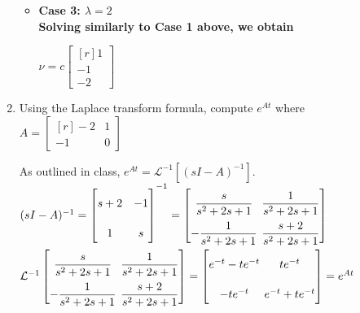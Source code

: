 \documentclass[11pt, oneside, letter]{article}
\begin{document}
\begin{enumerate}
\begin{itemize}
		\flushleft
		\item \bf Case 3: $\lambda = 2$ \rm \\
		Solving similarly to Case 1 above, we obtain
		
		\centering
		$\nu = c\begin{bmatrix*}[r] 1 \\ -1 \\ -2 \end{bmatrix*}$ \\
		\flushleft
		
		\end{itemize}
	
\vspace{4ex}
	
	\item Using the Laplace transform formula, compute $e^{At}$ where \\
	
	\centering $A = \begin{bmatrix*}[r] -2 & 1 \\ -1 & 0 \end{bmatrix*}$ \\
	\flushleft
	
	As outlined in class, $e^{At} = \mathcal{L}^{-1}[(sI - A)^{-1}]$. \\
	\centering
	\vspace{1ex}
	$(sI - A)^{-1} = 
	\begin{bmatrix*}[c] s + 2 & -1 \\ 1 & s
	\end{bmatrix*}^{-1} = 
	\arraycolsep=2pt\def\arraystretch{2.2}
	\begin{bmatrix*}[c] \dfrac{s}{s^2 + 2s + 1} & \dfrac{1}{s^2 + 2s + 1} \\ -\dfrac{1}{s^2 + 2s + 1} & \dfrac{s + 2}{s^2 + 2s + 1}
	\end{bmatrix*} $ \\
	

	\vspace{2ex}
	$\mathcal{L}^{-1}
	\arraycolsep=2pt\def\arraystretch{2.2}
	\begin{bmatrix*}[c] \dfrac{s}{s^2 + 2s + 1} & \dfrac{1}{s^2 + 2s + 1} \\ -\dfrac{1}{s^2 + 2s + 1} & \dfrac{s + 2}{s^2 + 2s + 1}
	\end{bmatrix*} = \begin{bmatrix*}[c]
	e^{-t} -te^{-t} & te^{-t} \\ -te^{-t} & e^{-t} + te^{-t}
	\end{bmatrix*} = e^{At}$ \\
	

\end{enumerate}
\end{document}
